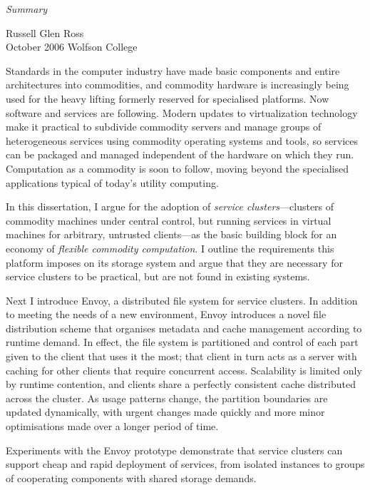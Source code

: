 

{
\thispagestyle{empty}
\begin{center}
{
    \Large \thesistitlebig

    \bigskip

    \textit{\large Summary}
}
\end{center}

\hfill Russell Glen Ross\\
October 2006 \hfill Wolfson College\\
}




\noindent Standards in the computer industry have made basic components and entire architectures into commodities, and commodity hardware is increasingly being used for the heavy lifting formerly reserved for specialised platforms. Now software and services are following. Modern updates to virtualization technology make it practical to subdivide commodity servers and manage groups of heterogeneous services using commodity operating systems and tools, so services can be packaged and managed independent of the hardware on which they run. Computation as a commodity is soon to follow, moving beyond the specialised applications typical of today's utility computing.

In this dissertation, I argue for the adoption of \emph{service clusters}---clusters of commodity machines under central control, but running services in virtual machines for arbitrary, untrusted clients---as the basic building block for an economy of \emph{flexible commodity computation}. I outline the requirements this platform imposes on its storage system and argue that they are necessary for service clusters to be practical, but are not found in existing systems.

Next I introduce Envoy, a distributed file system for service clusters. In addition to meeting the needs of a new environment, Envoy introduces a novel file distribution scheme that organises metadata and cache management according to runtime demand. In effect, the file system is partitioned and control of each part given to the client that uses it the most; that client in turn acts as a server with caching for other clients that require concurrent access. Scalability is limited only by runtime contention, and clients share a perfectly consistent cache distributed across the cluster. As usage patterns change, the partition boundaries are updated dynamically, with urgent changes made quickly and more minor optimisations made over a longer period of time.

Experiments with the Envoy prototype demonstrate that service clusters can support cheap and rapid deployment of services, from isolated instances to groups of cooperating components with shared storage demands.